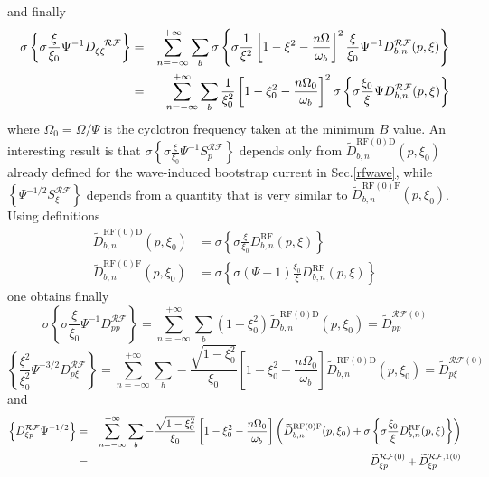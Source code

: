 and finally
\begin{eqnarray}
\sigma \left\{ \sigma \frac{\xi }{\xi _{0}}\Psi ^{-1}D_{\xi \xi }^{\mathcal{%
\ \ RF}}\right\} &=&\sum_{n=-\infty }^{+\infty }\sum_{b}\sigma \left\{
\sigma \frac{1}{\xi ^{2}}\left[ 1-\xi ^{2}-\frac{n\Omega }{\omega _{b}}%
\right] ^{2}\frac{\xi }{\xi _{0}}\Psi ^{-1}D_{b,n}^{\mathcal{RF}}(p,\xi
)\right\}  \nonumber \\
&=&\sum_{n=-\infty }^{+\infty }\sum_{b}\frac{1}{\xi _{0}^{2}}\left[ 1-\xi
_{0}^{2}-\frac{n\Omega _{0}}{\omega _{b}}\right] ^{2}\sigma \left\{ \sigma
\frac{\xi _{0}}{\xi }\Psi D_{b,n}^{\mathcal{RF}}(p,\xi )\right\}
\end{eqnarray}
where $\Omega _{0}=\Omega /\Psi $ is the cyclotron frequency taken at the
minimum $B$ value. An interesting result is that $\sigma \left\{ \sigma
\frac{\xi }{\xi _{0}}\Psi ^{-1}S_{p}^{\mathcal{RF}}\right\} $ depends only
from $\widetilde{D}_{b,n}^{\text{RF}(0)\text{D}}(p,\xi _{0})$ already
defined for the wave-induced bootstrap current in Sec.\ref{rfwave}, while $%
\left\{ \Psi ^{-1/2}S_{\xi }^{\mathcal{RF}}\right\} $ depends from a
quantity that is very similar to $\widetilde{D}_{b,n}^{\text{RF}(0)\text{F}
}(p,\xi _{0})$. Using definitions
\begin{align}
\widetilde{D}_{b,n}^{\text{RF}(0)\text{D}}(p,\xi _{0})& =\sigma \left\{
\sigma \frac{\xi }{\xi _{0}}D_{b,n}^{\text{RF}}(p,\xi )\right\} \\
\widetilde{D}_{b,n}^{\text{RF}(0)\text{F}}(p,\xi _{0})& =\sigma \left\{
\sigma \left( \Psi -1\right) \frac{\xi _{0}}{\xi }D_{b,n}^{\text{RF}}(p,\xi
)\right\}
\end{align}
one obtains finally
\begin{equation}
\sigma \left\{ \sigma \frac{\xi }{\xi _{0}}\Psi ^{-1}D_{pp}^{\mathcal{RF}
}\right\} =\sum_{n=-\infty }^{+\infty }\sum_{b}(1-\xi _{0}^{2})\widetilde{D}
_{b,n}^{\text{RF}(0)\text{D}}(p,\xi _{0})=\widetilde{D}_{pp}^{\mathcal{RF}
\left( 0\right) }
\end{equation}
\begin{equation}
\left\{ \frac{\xi ^{2}}{\xi _{0}^{2}}\Psi ^{-3/2}D_{p\xi }^{\mathcal{RF}%
}\right\} =\sum_{n=-\infty }^{+\infty }\sum_{b}-\frac{\sqrt{1-\xi _{0}^{2}}}{
\xi _{0}}\left[ 1-\xi _{0}^{2}-\frac{n\Omega _{0}}{\omega _{b}}\right]
\widetilde{D}_{b,n}^{\text{RF}(0)\text{D}}(p,\xi _{0})=\widetilde{D}_{p\xi
}^{\mathcal{RF}\left( 0\right) }
\end{equation}
and
\begin{eqnarray}
\left\{ D_{\xi p}^{\mathcal{RF}}\Psi ^{-1/2}\right\} &=&\sum_{n=-\infty
}^{+\infty }\sum_{b}-\frac{\sqrt{1-\xi _{0}^{2}}}{\xi _{0}}\left[ 1-\xi
_{0}^{2}-\frac{n\Omega _{0}}{\omega _{b}}\right] \left( \widetilde{D}_{b,n}^{%
\text{RF}(0)\text{F}}(p,\xi _{0})+\sigma \left\{ \sigma \frac{\xi _{0}}{\xi }
D_{b,n}^{\text{RF}}(p,\xi )\right\} \right)  \nonumber \\
&=&\widetilde{D}_{\xi p}^{\mathcal{RF}\left( 0\right) }+\widetilde{D}_{\xi
p}^{\mathcal{RF},1\left( 0\right) }
\end{eqnarray}
